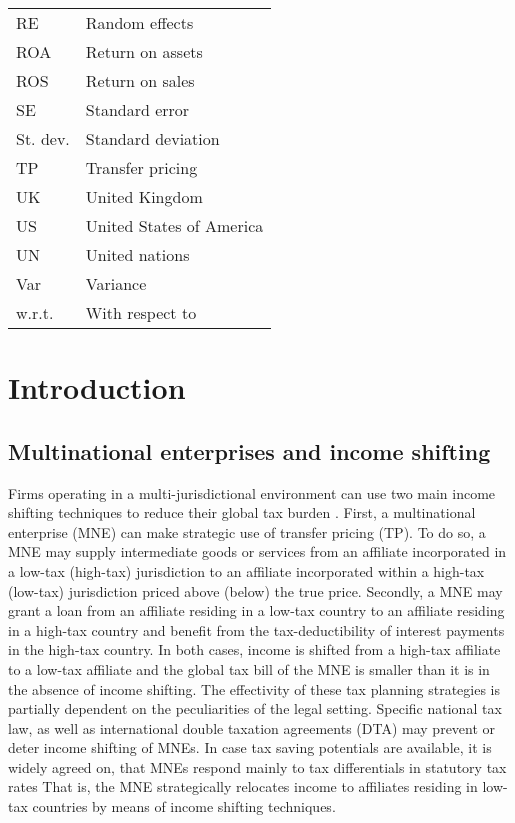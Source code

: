 \documentclass[10pt,twocolumn,oneside,cmyk]{article}
\begin{document}
\begin{center}
\begin{tabularx}{\textwidth}{l X}
  RE &Random effects \\
  ROA &Return on assets \\
  ROS &Return on sales \\
  SE &Standard error \\
  St. dev. &Standard deviation \\
  TP &Transfer pricing \\
  UK &United Kingdom \\
  US &United States of America\\
  UN &United nations \\
  Var &Variance \\
  w.r.t. &With respect to \\
 \end{tabularx}
\end{center}
\clearpage
\twocolumn

\section{Introduction} \label{sec:1}
\subsection{Multinational enterprises and income shifting} \label{sec:Multinational enterprises and income shifting}
Firms operating in a multi-jurisdictional environment can use two main income shifting techniques to reduce their global tax burden \parencite[2227]{bartelsman_why_2003}. First, a multinational enterprise (MNE) can make strategic use of transfer pricing (TP). To do so, a MNE may supply intermediate goods or services from an affiliate incorporated in a low-tax (high-tax) jurisdiction to an affiliate incorporated within a high-tax (low-tax) jurisdiction priced above (below) the true price. Secondly, a MNE may grant a loan from an affiliate residing in a low-tax country to an affiliate residing in a high-tax country and benefit from the tax-deductibility of interest payments in the high-tax country. In both cases, income is shifted from a high-tax affiliate to a low-tax affiliate and the global tax bill of the MNE is smaller than it is in the absence of income shifting. The effectivity of these tax planning strategies is partially dependent on the peculiarities of the legal setting. Specific national tax law, as well as international double taxation agreements (DTA) may prevent or deter income shifting of MNEs. In case tax saving potentials are available, it is widely agreed on, that MNEs respond mainly to tax differentials in statutory tax rates \parencites(for example)()[307]{haufler_corporate_2000}[][1499]{becker_corporate_2012} That is, the MNE strategically relocates income to affiliates residing in low-tax countries by means of income shifting techniques.
\end{document}
